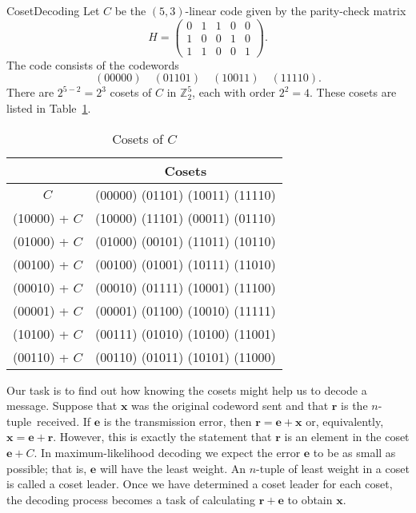  
\begin{example}{CosetDecoding}
Let $C$ be the $(5,3)$-linear code given by the parity-check matrix
\[
H =
\begin{pmatrix}
0 & 1 & 1 & 0 & 0 \\
1 & 0 & 0 & 1 & 0 \\
1 & 1 & 0 & 0 & 1
\end{pmatrix}.
\]
The code consists of the codewords
\[
(00000) \quad (01101) \quad (10011) \quad (11110).
\]
There are $2^{5-2} = 2^3$ cosets of $C$ in ${\mathbb Z}_2^5$, each with
order $2^2 =4$.  These cosets are listed in Table~\ref{CosetsofC}. 
\end{example}


\begin{table}
{\small
\begin{center}
\medskip
\begin{tabular}{|c|c|}
\hline
 & Cosets \\
\hline
          $C$ & (00000)  (01101)  (10011)  (11110) \\
(10000) + $C$ & (10000)  (11101)  (00011)  (01110) \\
(01000) + $C$ & (01000)  (00101)  (11011)  (10110) \\
(00100) + $C$ & (00100)  (01001)  (10111)  (11010) \\
(00010) + $C$ & (00010)  (01111)  (10001)  (11100) \\
(00001) + $C$ & (00001)  (01100)  (10010)  (11111) \\
(10100) + $C$ & (00111)  (01010)  (10100)  (11001) \\
(00110) + $C$ & (00110)  (01011)  (10101)  (11000) \\
\hline
\end{tabular}
\end{center}
}
\caption{Cosets of $C$}\label{CosetsofC}
\end{table}
 
 

 
 
Our task is to find out how knowing the cosets might help us to 
decode a
message. Suppose that ${\mathbf x}$ was the original codeword sent and
that ${\mathbf r}$ is the \mbox{$n$-tuple received}. If ${\mathbf e}$ is the
transmission error, then ${\mathbf r} = {\mathbf e} + {\mathbf x}$ or,
equivalently, ${\mathbf x} = {\mathbf e} + {\mathbf r}$. However, this is
exactly the statement that ${\mathbf r}$ is an element in the coset 
${\mathbf e} + C$. In maximum-likelihood decoding we expect the error
${\mathbf e}$ to be as small as possible; that is, ${\mathbf e}$ will have
the least weight. An $n$-tuple of least weight in a coset is called a
{\bfi coset leader}. Once we have determined a
coset leader for each coset, the decoding process becomes a task
of calculating ${\mathbf r} + {\mathbf e}$ to obtain ${\mathbf x}$.
 
